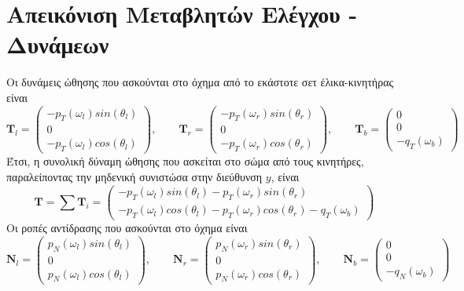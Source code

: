 \section{Απεικόνιση Μεταβλητών Ελέγχου - Δυνάμεων}

Οι δυνάμεις ώθησης που ασκούνται στο όχημα από το
εκάστοτε σετ έλικα-κινητήρας είναι
\begin{equation*}
    \mathbf{T}_l = \begin{pmatrix}
        -p_T(\omega_l)sin(\theta_l) \\
        0                           \\
        -p_T(\omega_l)cos(\theta_l)
    \end{pmatrix},\qquad
    \mathbf{T}_r = \begin{pmatrix}
        -p_T(\omega_r)sin(\theta_r) \\
        0                           \\
        -p_T(\omega_r)cos(\theta_r)
    \end{pmatrix},\qquad
    \mathbf{T}_b = \begin{pmatrix}
        0 \\
        0 \\
        -q_T(\omega_b)
    \end{pmatrix}
\end{equation*}
Έτσι, η συνολική δύναμη ώθησης που ασκείται στο σώμα από τους κινητήρες, παραλείποντας την μηδενική συνιστώσα στην διεύθυνση $y$, είναι
\begin{equation*}
    \mathbf{T} = \sum \mathbf{T}_i =
    \begin{pmatrix}
        -p_T(\omega_l)sin(\theta_l)-p_T(\omega_r)sin(\theta_r) \\[3pt]
        -p_T(\omega_l)cos(\theta_l) -p_T(\omega_r)cos(\theta_r)-q_T(\omega_b)
    \end{pmatrix}
\end{equation*}
Οι ροπές αντίδρασης που ασκούνται στο όχημα είναι
\begin{equation*}
    \mathbf{N}_l = \begin{pmatrix}
        p_N(\omega_l)sin(\theta_l) \\
        0                          \\
        p_N(\omega_l)cos(\theta_l)
    \end{pmatrix},\qquad
    \mathbf{N}_r = \begin{pmatrix}
        p_N(\omega_r)sin(\theta_r) \\
        0                          \\
        p_N(\omega_r)cos(\theta_r)
    \end{pmatrix},\qquad
    \mathbf{N}_b = \begin{pmatrix}
        0 \\
        0 \\
        -q_N(\omega_b)
    \end{pmatrix}
\end{equation*}
